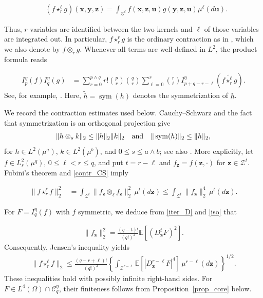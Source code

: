 \documentclass[letterpaper,11pt,reqno]{amsart}
\numberwithin{equation}{section}
\theoremstyle{plain}
\theoremstyle{definition}
\theoremstyle{remark}
\newcommand{\E}{\mathbb{E}}
\newcommand{\cC}{\mathcal{C}}
\newcommand{\cZ}{\mathcal{Z}}
\DeclareMathOperator{\sym}{sym}
\newcommand{\noi}{\noindent}
\newcommand{\dd}{d}
\newcommand{\wt}{\widetilde}
\newcommand{\AND}{\quad{\rm and}\quad}
\begin{document}
\noi
\begin{align*}
 &(f\star_r^\ell g)(\mathbf x,\mathbf y,\mathbf z)=
 \int_{\cZ^\ell}
 f(\mathbf x,\mathbf z,\mathbf u)
 g(\mathbf y,\mathbf z,\mathbf u)
 \mu^\ell(\dd\mathbf u).
\end{align*}

Thus, $r$ variables are identified between the two kernels and
$\ell$ of those variables are integrated out.  In particular,
$f\star_r^r g$ is the ordinary contraction
as in \cite[Appendix B]{NP12}, which we also
denote by $f\otimes_r g$.  Whenever all terms are well defined in
$L^2$, the product formula reads

\noi
\begin{align}
 I_p^\eta(f)I_q^\eta(g)
 &=\sum_{r=0}^{p\wedge q}
 r!\binom pr\binom qr
 \sum_{\ell=0}^r\binom r\ell
 I_{p+q-r-\ell}^\eta
 \left(f\wt{\star_r^\ell} g\right).
 \label{Poi_prod_full}
\end{align}
See, for example, \cite[Proposition~5]{Las16}.
Here, $\wt h=\sym(h)$ denotes
the symmetrization of $h$.

We record the contraction estimates used below.  Cauchy--Schwarz
and the fact that symmetrization is an orthogonal projection give
\noi
\begin{align}
 \|h\otimes_s k\|_2
 \leq\|h\|_2\|k\|_2
 \AND
 \|\sym(h)\|_2\leq\|h\|_2,
 \label{contr_CS}
\end{align}
for $h\in L^2(\mu^a)$, $k\in L^2(\mu^b)$, and
$0\leq s\leq a\wedge b$; see also \cite[Appendix B]{NP12}.
More explicitly, let $f\in L_s^2(\mu^q)$,
$0\leq\ell<r\leq q$, and put $t=r-\ell$ and
$f_{\boldsymbol z}=f(\boldsymbol z,\cdot)$ for
$\boldsymbol z\in\cZ^t$.  Fubini's theorem and
\eqref{contr_CS} imply

\noi
\begin{align}
 \big\|f\star_r^\ell f \big\|_2^2
 &=\int_{\cZ^t}
 \|f_{\boldsymbol z}\otimes_\ell
 f_{\boldsymbol z}\|_2^2\,\mu^t(\dd\boldsymbol z)
 \leq\int_{\cZ^t}\|f_{\boldsymbol z}\|_2^4
 \,\mu^t(\dd\boldsymbol z).
 \label{star_section}
\end{align}

For $F=I_q^\eta(f)$ with $f$ symmetric,
we deduce from \eqref{iter_D} and \eqref{iso} that


\noi
\begin{align*}
 \|f_{\boldsymbol z}\|_2^2
 =\frac{(q-t)!}{(q!)^2}
 \E[(D^t_{\boldsymbol z}F)^2].
\end{align*}
Consequently, Jensen's inequality yields
\noi
\begin{align}
 \|f\star_r^\ell f\|_2
 \leq\frac{(q-r+\ell)!}{(q!)^2}
 \left\{
 \int_{\cZ^{r-\ell}}
 \E[|D^{r-\ell}_{\boldsymbol z}F|^4]
 \,\mu^{r-\ell}(\dd\boldsymbol z)
 \right\}^{1/2}.
 \label{star_D}
\end{align}
These inequalities hold with possibly infinite right-hand sides.
For $F\in L^4(\Omega)\cap \cC_q^\eta$, their finiteness follows from
Proposition~\ref{prop_core} below.
\end{document}

